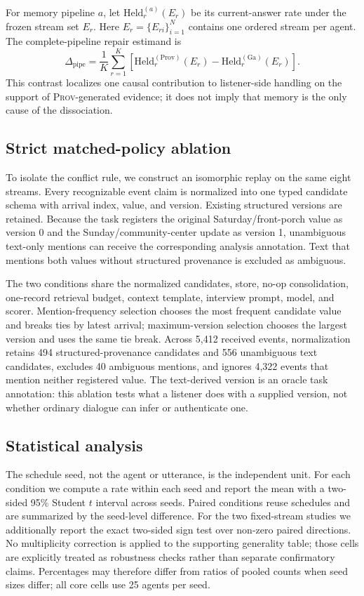 \documentclass[sigconf,anonymous]{acmart}
\newcommand{\prov}{\textsc{Prov}}
\begin{document}
For memory pipeline $a$, let $\mathrm{Held}_r^{(a)}(E_r)$ be its current-answer rate under the
frozen stream set $E_r$.  Here $E_r=\{E_{ri}\}_{i=1}^{N}$ contains one ordered stream per agent.
The complete-pipeline repair estimand is
\[
 \Delta_{\mathrm{pipe}}=
 \frac{1}{K}\sum_{r=1}^{K}
 \left[\mathrm{Held}_r^{(\mathrm{Prov})}(E_r)
       -\mathrm{Held}_r^{(\mathrm{Ga})}(E_r)\right].
\]
This contrast localizes one causal contribution to listener-side handling on the support of
\prov{}-generated evidence; it does not imply that memory is the only cause of the dissociation.

\subsection{Strict matched-policy ablation}

To isolate the conflict rule, we construct an isomorphic replay on the same eight streams.  Every
recognizable event claim is normalized into one typed candidate schema with arrival index, value,
and version.  Existing structured versions are retained.  Because the task registers the original
Saturday/front-porch value as version 0 and the Sunday/community-center update as version 1,
unambiguous text-only mentions can receive the corresponding analysis annotation.  Text that
mentions both values without structured provenance is excluded as ambiguous.

The two conditions share the normalized candidates, store, no-op consolidation, one-record
retrieval budget, context template, interview prompt, model, and scorer.  Mention-frequency
selection chooses the most frequent candidate value and breaks ties by latest arrival;
maximum-version selection chooses the largest version and uses the same tie break.  Across 5,412
received events, normalization retains 494 structured-provenance candidates and 556 unambiguous
text candidates, excludes 40 ambiguous mentions, and ignores 4,322 events that mention neither
registered value.  The text-derived version is an oracle task annotation: this ablation tests what
a listener does with a supplied version, not whether ordinary dialogue can infer or authenticate
one.

\subsection{Statistical analysis}

The schedule seed, not the agent or utterance, is the independent unit.  For each condition we
compute a rate within each seed and report the mean with a two-sided 95\% Student $t$ interval
across seeds.  Paired conditions reuse schedules and are summarized by the seed-level difference.
For the two fixed-stream studies we additionally report the exact two-sided sign test over
non-zero paired directions.  No multiplicity correction is applied to the supporting
generality table; those cells are explicitly treated as robustness checks rather than separate
confirmatory claims.  Percentages may therefore differ from ratios of pooled counts when seed
sizes differ; all core cells use 25 agents per seed.
\end{document}
